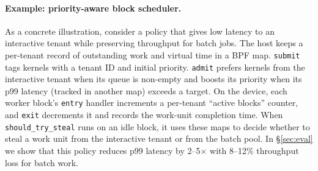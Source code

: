 \paragraph{Example: priority-aware block scheduler.}
As a concrete illustration, consider a policy that gives low latency to an interactive tenant while preserving throughput for batch jobs. The host keeps a per-tenant record of outstanding work and virtual time in a BPF map. \texttt{submit} tags kernels with a tenant ID and initial priority. \texttt{admit} prefers kernels from the interactive tenant when its queue is non-empty and boosts its priority when its p99 latency (tracked in another map) exceeds a target. On the device, each worker block's \texttt{entry} handler increments a per-tenant ``active blocks'' counter, and \texttt{exit} decrements it and records the work-unit completion time. When \texttt{should\_try\_steal} runs on an idle block, it uses these maps to decide whether to steal a work unit from the interactive tenant or from the batch pool. In \S\ref{sec:eval} we show that this policy reduces p99 latency by 2--5$\times$ with 8--12\% throughput loss for batch work.
